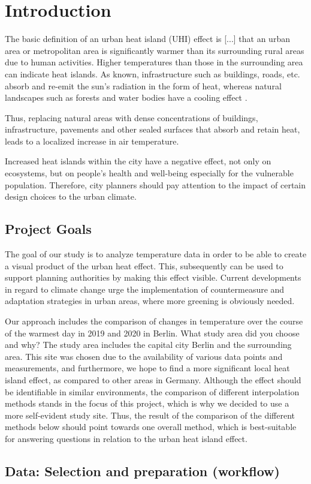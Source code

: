 
\section{Introduction}

The basic definition of an urban heat island (UHI) effect is \ldq{}[...] that an urban area or metropolitan area is significantly warmer than its surrounding rural areas due to human activities\rdq{}\cite{takebayashi_chapter_2020}. Higher temperatures than those in the surrounding area can indicate heat islands. As known, infrastructure such as buildings, roads, etc. absorb and re-emit the sun’s radiation in the form of heat, whereas natural landscapes such as forests and water bodies have a cooling effect \cite{us_epa_learn_2014}.

Thus, replacing natural areas with dense concentrations of buildings, infrastructure, pavements and other sealed surfaces that absorb and retain heat, leads to a localized increase in air temperature. 

Increased heat islands within the city have a negative effect, not only on ecosystems, but on people’s health and well-being especially for the vulnerable population. Therefore, city planners should pay attention to the impact of certain design choices to the urban climate.

\subsection{Project Goals}
The goal of our study is to analyze temperature data in order to be able to create a visual product of the urban heat effect. This, subsequently can be used to support planning authorities by making this effect visible. Current developments in regard to climate change urge the implementation of countermeasure and adaptation strategies in urban areas, where more greening is obviously needed. \cite{ketterer_comparison_2015}


Our approach includes the comparison of changes in temperature over the course of the warmest day in 2019 and 2020 in Berlin. What study area did you choose and why?
The study area includes the capital city Berlin and the surrounding area. This site was chosen due to the availability of various data points and measurements, and furthermore, we hope to find a more significant local heat island effect, as compared to other areas in Germany. Although the effect should be identifiable in similar environments, the comparison of different interpolation methods stands in the focus of this project, which is why we decided to use a more self-evident study site. Thus, the result of the comparison of the different methods below should point towards one overall method, which is best-suitable for answering questions in relation to the urban heat island effect.

\subsection{Data: Selection and preparation (workflow)}